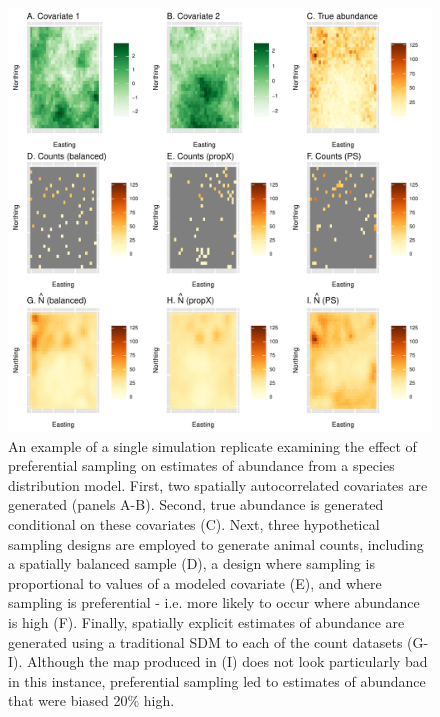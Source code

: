 \documentclass[times,mee,doublespace,]{besauth2}
\begin{document}
\begin{figure} %
\begin{center}
\includegraphics[width=170mm]{PS_maps.pdf}
\caption{An example of a single simulation replicate examining the effect of preferential sampling on estimates of abundance from a species distribution model.  First, two spatially autocorrelated covariates are generated (panels A-B).  Second, true abundance is generated conditional on these covariates (C).  Next, three hypothetical sampling designs are employed to generate animal counts, including a spatially balanced sample (D), a design where sampling is proportional to values of a modeled covariate (E), and where sampling is preferential - i.e. more likely to occur where abundance is high (F).  Finally, spatially explicit estimates of abundance are generated using a traditional SDM to each of the count datasets (G-I).  Although the map produced in (I) does not look particularly bad in this instance, preferential sampling led to estimates of abundance that were biased 20\% high.}
\label{fig:PS_sims}
\end{center}
\end{figure}
\end{document}

